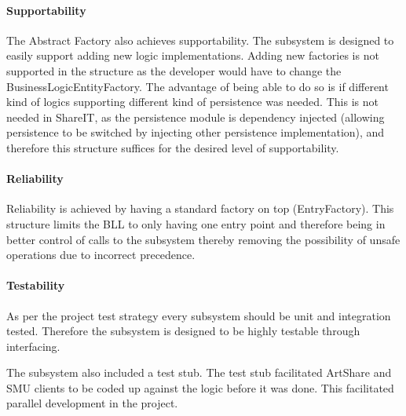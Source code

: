 \documentclass[../report.tex]{subfiles}
\begin{document}
\paragraph{Supportability} 
The Abstract Factory also achieves supportability. The subsystem is designed to easily support adding new logic
implementations. Adding new factories is not supported in the structure as the developer would have to change the BusinessLogicEntityFactory. The advantage of being able to do so is if different kind of logics supporting different kind of persistence was needed. This is not needed in ShareIT, as the persistence module is dependency injected (allowing persistence to be switched by injecting other persistence implementation), and therefore this structure suffices for the desired level of supportability.

\paragraph{Reliability} 
Reliability is achieved by having a standard factory on top (EntryFactory). This structure limits the BLL to only having one entry point and therefore being in better control of calls to the subsystem thereby removing the possibility of unsafe operations due to incorrect precedence. 

\paragraph{Testability}
As per the project test strategy every subsystem should be unit and integration tested. Therefore the subsystem is designed to be highly testable through interfacing.

The subsystem also included a test stub. The test stub facilitated ArtShare and SMU clients to be coded up against the logic before it was done. This facilitated parallel development in the project.
\end{document}
